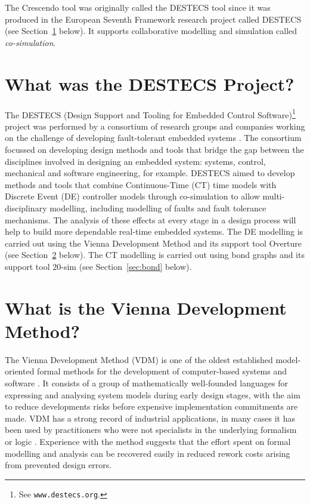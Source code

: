 \documentclass{crescendorepchap}
\newcommand{\url}[1]{\texttt{#1}}
\begin{document}
The Crescendo tool was originally called the DESTECS tool since it was produced in the European Seventh Framework research project called DESTECS (see Section~\ref{sec:destecs} below). It supports collaborative modelling and simulation called \emph{co-simulation}. 

\section{What was the DESTECS Project?}\label{sec:destecs}

The DESTECS (Design Support and Tooling for Embedded Control
Software)\footnote{See \url{www.destecs.org}.} project was performed by a
consortium of research groups and companies working on the challenge
of developing fault-tolerant embedded systems \cite{Broenink&10}. The
consortium focussed on developing design methods and tools that
bridge the gap between the disciplines involved in designing an
embedded system: systems, control, mechanical and software
engineering, for example.  DESTECS aimed to develop methods and tools
that combine Continuous-Time (CT) time models with Discrete Event (DE)
controller models through co-simulation to allow multi-disciplinary
modelling, including modelling of faults and fault tolerance
mechanisms. The analysis of these effects at every stage in a design
process will help to build more dependable real-time embedded systems. The DE modelling is carried out using the Vienna Development Method and its support tool Overture (see Section~\ref{sec:vdm} below). The CT modelling is carried out using bond graphs and its support tool 20-sim (see Section~\ref{sec:bond} below).

\section{What is the Vienna Development Method?} \label{sec:vdm}

The Vienna Development Method (VDM) is one of the oldest established
model-oriented formal methods for the development of computer-based
systems and software \cite{Bjorner&78,Jones90a,Fitzgerald&08c}. It consists of a
group of mathematically well-founded languages for expressing and analysing system
models during early design stages, with the aim to reduce developments risks
before expensive implementation commitments are made. VDM has a strong
record of industrial applications, in many cases it has been used
by practitioners who were not specialists in the underlying formalism or logic
\cite{Larsen&96b,Clement&99,Kurita&09}. Experience with the method
suggests that the effort spent on formal modelling and analysis can
be recovered easily in reduced rework costs arising from prevented
design errors.
\end{document}

